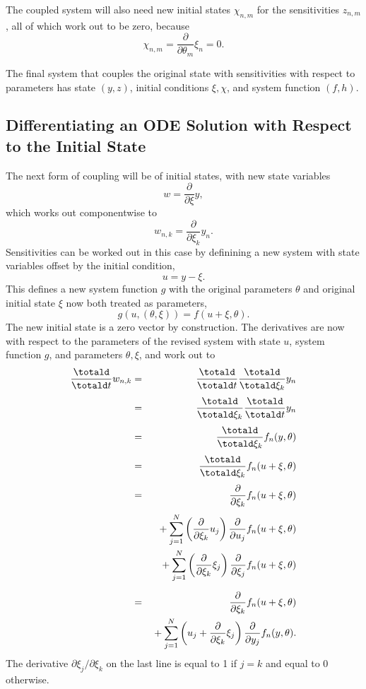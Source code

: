 \documentclass[10pt]{article}
\begin{document}
The coupled system will also need new initial states $\chi_{n,m}$ for
the sensitivities $z_{n,m}$, all of which work out to be zero, because
\[
\chi_{n,m} = \frac{\partial}{\partial \theta_m} \xi_n = 0.
\]

The final system that couples the original state with sensitivities
with respect to parameters has state $(y,z)$, initial conditions
$\xi,\chi$, and system function $(f,h)$.

\subsection{Differentiating an ODE Solution with Respect to the Initial State}

The next form of coupling will be of initial states, with new state
variables
\[
w = \frac{\partial}{\partial \xi} y,
\]
which works out componentwise to
\[
w_{n,k} = \frac{\partial}{\partial \xi_{k}} y_n.
\]
Sensitivities can be worked out in this case by definining a new
system with state variables offset by the initial condition,
\[
u = y - \xi.
\]
This defines a new system function $g$ with the original parameters
$\theta$ and original initial state $\xi$ now both treated as
parameters,
\[
g(u,(\theta,\xi)) = f(u + \xi, \theta).
\]
The new initial state is a zero vector by construction.  The
derivatives are now with respect to the parameters of the revised
system with state $u$, system function $g$, and parameters
$\theta,\xi$, and work out to
%
\begin{eqnarray*}
\frac{\totald}{\totald t} w_{n,k}
& = & \frac{\totald}{\totald t} \frac{\totald}{\totald \xi_{k}} y_n
\\[3pt]
& = & \frac{\totald}{\totald \xi_k} \frac{\totald}{\totald t} y_n
\\[3pt]
& = & \frac{\totald}{\totald \xi_k} f_n(y,\theta)
\\[3pt]
& = & \frac{\totald}{\totald \xi_k} f_n(u + \xi, \theta)
\\[3pt]
& = & \frac{\partial}{\partial \xi_k} f_n(u + \xi, \theta)
\\[3pt]
& & 
{ } + \sum_{j=1}^N 
        \left( \frac{\partial}{\partial \xi_k} u_j \right)
           \frac{\partial}{\partial u_j} f_n(u + \xi, \theta)
\\
& & 
 { } + \sum_{j=1}^N
         \left( \frac{\partial}{\partial \xi_k} \xi_j \right)
         \frac{\partial}{\partial \xi_j} f_n(u + \xi, \theta)
\\[6pt]
& = & 
\frac{\partial}{\partial \xi_k} f_n(u + \xi, \theta)
\\
& & { } + \sum_{j=1}^N \left( u_j + \frac{\partial}{\partial \xi_k} \xi_j
\right)
\frac{\partial}{\partial y_j} f_n(y,\theta).
\end{eqnarray*}
%
The derivative $\partial \xi_j / \partial \xi_k$ on the last line is
equal to 1 if $j = k$ and equal to 0 otherwise.
\end{document}
